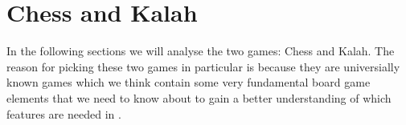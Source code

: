 \section{Chess and Kalah}
\label{sec:chessandkalah}

In the following sections we will analyse the two games: Chess and Kalah. The
reason for picking these two games in particular is because they are
universially known games which we think contain some very fundamental board game
elements that we need to know about to gain a better understanding of which
features are needed in \productname{}.


  

